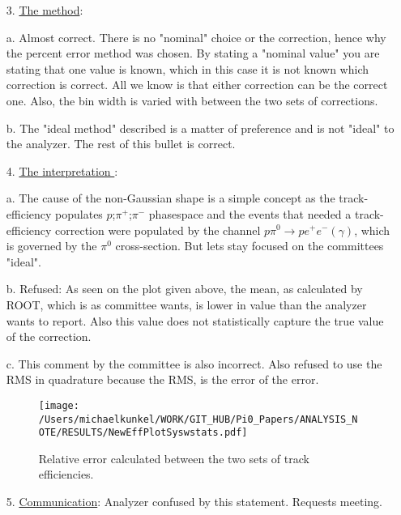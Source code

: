 \documentclass[10pt,a4paper]{report}
\newlength{\figwidth}
\newlength{\hfigheight}
\begin{document}
\begin{itemize}
	\item[3.] \underline{The method}:
		\item[a.] Almost correct. There is no "nominal" choice or the correction, hence why the percent error method was chosen. By stating a "nominal value" you are stating that one value is known, which in this case it is not known which correction is correct. All we know is that either correction can be the correct one.  Also, the bin width is varied with between the two sets of corrections.
		\item[b.] The "ideal method" described is a matter of preference and is not "ideal" to the analyzer. The rest of this bullet is correct.
	\item[4.] \underline{The interpretation }:
			\item[a.] The cause of the non-Gaussian shape is a simple concept as the track-efficiency populates $p$;$\pi^{+}$;$\pi^{-}$ phasespace and the events that needed a track-efficiency correction were populated by the channel $p \pi^{0} \to p e^{+}e^{-}(\gamma)$, which is governed by the $\pi^{0}$ cross-section. But lets stay focused on the committees "ideal".  
			\item[b.] Refused: As seen on the plot given above, the mean, as calculated by ROOT, which is as committee wants, is lower in value than the analyzer wants to report. Also this value does not statistically capture the true value of the correction.
			\item[c.] This comment by the committee is also incorrect. Also refused to use the RMS in quadrature because the RMS, is the error of the error. 
			 \begin{figure}[h!]\begin{center}
					\texttt{[image: /Users/michaelkunkel/WORK/GIT\_HUB/Pi0\_Papers/ANALYSIS\_NOTE/RESULTS/NewEffPlotSyswstats.pdf]}
					\caption{Relative error calculated between the two sets of track efficiencies.}\label{fig:toteff_error}
				\end{center}\end{figure}
	\item[5.] \underline{Communication}: Analyzer confused by this statement. Requests meeting.
\end{itemize}
\end{document}
